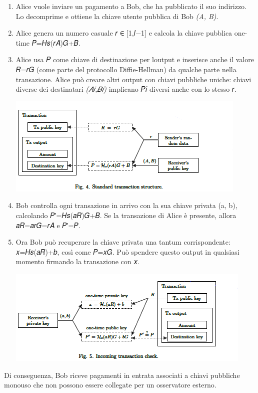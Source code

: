 \documentclass[
]{article}
\begin{document}
\begin{enumerate}
\def\labelenumi{\arabic{enumi}.}
\item
  Alice vuole inviare un pagamento a Bob, che ha pubblicato il suo
  indirizzo. Lo decomprime e ottiene la chiave utente pubblica di Bob
  \emph{(A, B)}.
\item
  Alice genera un numero casuale 𝑟 ∈ {[}1,𝑙−1{]} e calcola la chiave
  pubblica one-time 𝑃=𝐻𝑠(𝑟𝐴)𝐺+𝐵.
\item
  Alice usa 𝑃 come chiave di destinazione per l\textquotesingle output e
  inserisce anche il valore 𝑅=𝑟𝐺 (come parte del protocollo
  Diffie-Hellman) da qualche parte nella transazione. Alice può creare
  altri output con chiavi pubbliche uniche: chiavi diverse dei
  destinatari \emph{(𝐴𝑖,𝐵𝑖)} implicano 𝑃𝑖\hspace{0pt} diversi anche con
  lo stesso 𝑟.

  \includegraphics{media/image3.png}
\item
  Bob controlla ogni transazione in arrivo con la sua chiave privata (a,
  b), calcolando 𝑃′=𝐻𝑠(𝑎𝑅)𝐺+𝐵. Se la transazione di Alice è presente,
  allora 𝑎𝑅=𝑎𝑟𝐺=𝑟𝐴 e 𝑃′=𝑃.
\item
  Ora Bob può recuperare la chiave privata una tantum corrispondente:
  𝑥=𝐻𝑠(𝑎𝑅)+𝑏, così come 𝑃=𝑥𝐺. Può spendere questo output in qualsiasi
  momento firmando la transazione con 𝑥.

  \includegraphics{media/image4.png}
\end{enumerate}

Di conseguenza, Bob riceve pagamenti in entrata associati a chiavi
pubbliche monouso che non possono essere collegate per un osservatore
esterno.
\end{document}
